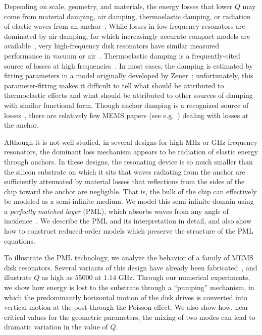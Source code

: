 \documentclass{article}
\begin{document}
Depending on scale, geometry, and materials, the energy losses that
lower $Q$ may come from material damping, air damping, thermoelastic
damping, or radiation of elastic waves from an
anchor~\cite{Candler:2003:IEL}.  While losses in low-frequency
resonators are dominated by air damping, for which increasingly
accurate compact models are available~\cite{Ye:2003:ADL,Bao:2003:MRE},
very high-frequency disk resonators have similar measured performance
in vacuum or air~\cite{Wang:2003:SAG}.  Thermoelastic damping is a
frequently-cited source of losses at high
frequencies~\cite{Duwel:2003:EST,Houston:2002:TLM,Abdolvand:2003:TDT,Lifshitz:2000:TDM,Srikar:2002:TDF}.
In most cases, the damping is estimated by fitting parameters in a
model originally developed by
Zener~\cite{Zener:1937:IFS,Zener:1938:IFSa,Zener:1938:IFSb};
unfortunately, this parameter-fitting makes it difficult to tell what
should be attributed to thermoelastic effects and what should be
attributed to other sources of damping with similar functional form.
Though anchor damping is a recognized source of
losses~\cite{Candler:2003:IEL}, there are relatively few MEMS papers
(see e.g.~\cite{Park:2004:HFMa,Park:2004:HFMb}) dealing with losses at
the anchor.

Although it is not well studied, in several designs for high MHz or
GHz frequency resonators, the dominant loss mechanism appears to be
radiation of elastic energy through anchors.  In these designs, the
resonating device is so much smaller than the silicon substrate on
which it sits that waves radiating from the anchor are sufficiently
attenuated by material losses that reflections from the sides of the
chip toward the anchor are negligible.  That is, the bulk of the chip
can effectively be modeled as a semi-infinite medium.  We model this
semi-infinite domain using a \emph{perfectly matched layer} (PML),
which absorbs waves from any angle of incidence~\cite{Basu:2003:PML}.
We describe the PML and its interpretation in detail, and also show
how to construct reduced-order models which preserve the structure of
the PML equations.

To illustrate the PML technology, we analyze the behavior of a family
of MEMS disk resonators.  Several variants of this design have already
been fabricated~\cite{Wang:2003:SAG,Wang:2004:GND}, and illustrate $Q$
as high as $55000$ at $1.14$ GHz.  Through our numerical experiments,
we show how energy is lost to the substrate through a ``pumping''
mechanism, in which the predominantly horizontal motion of the disk
drives is converted into vertical motion at the post through the
Poisson effect.  We also show how, near critical values for the
geometric parameters, the mixing of two modes can lead to dramatic
variation in the value of $Q$.
\end{document}
